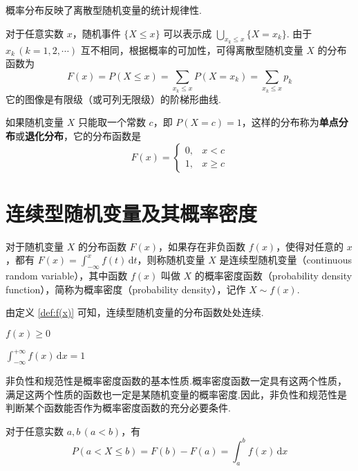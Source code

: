 概率分布反映了离散型随机变量的统计规律性.

对于任意实数 $x$，随机事件 $\{X \leqslant x\}$ 可以表示成 $\displaystyle\bigcup_{x_k \leqslant x} \{X=x_k\}$. 由于 $x_k\, (k=1,2,\cdots)$ 互不相同，根据概率的可加性，可得离散型随机变量 $X$ 的分布函数为
$$
F(x) = P(X \leqslant x) = \sum_{x_k \leqslant x} P(X=x_k) = \sum_{x_k \leqslant x} p_k
$$
它的图像是有限级（或可列无限级）的阶梯形曲线.

如果随机变量 $X$ 只能取一个常数 $c$，即 $P(X=c) = 1$，这样的分布称为\textbf{单点分布}或\textbf{退化分布}，它的分布函数是
$$
F(x) = \begin{cases}
    0, & x < c \\
    1, & x \geqslant c
\end{cases}
$$

\section{连续型随机变量及其概率密度}

\begin{definition}[][][def:f(x)]
    \indent 对于随机变量 $X$ 的分布函数 $F(x)$，如果存在非负函数 $f(x)$，使得对任意的 $x$，都有 $F(x)=\displaystyle\int_{-\infty}^x f(t)\,\text{d}t$，则称随机变量 $X$ 是{\heiti 连续型随机变量}（continuous random variable），其中函数 $f(x)$ 叫做 $X$ 的{\heiti 概率密度函数}（probability density function），简称为{\heiti 概率密度}（probability density），记作 $X \sim f(x)$.
\end{definition}

由定义 \ref{def:f(x)} 可知，连续型随机变量的分布函数处处连续.

\vspace{0.2em}

\begin{property}[][非负性][prop:f(x)>=0]
    \indent $f(x) \geqslant 0$
\end{property}

\begin{property}[][规范性][prop:f(x):integral=1]
    \indent $\displaystyle\int_{-\infty}^{+\infty} f(x)\,\text{d}x = 1$
\end{property}

非负性和规范性是概率密度函数的基本性质.概率密度函数一定具有这两个性质，满足这两个性质的函数也一定是某随机变量的概率密度.因此，非负性和规范性是判断某个函数能否作为概率密度函数的充分必要条件.

\begin{property}
    \indent 对于任意实数 $a,b\,(a<b)$，有
    $$
    P(a < X \leqslant b) = F(b)-F(a) = \int_a^b f(x)\,\text{d}x
    $$
\end{property}

